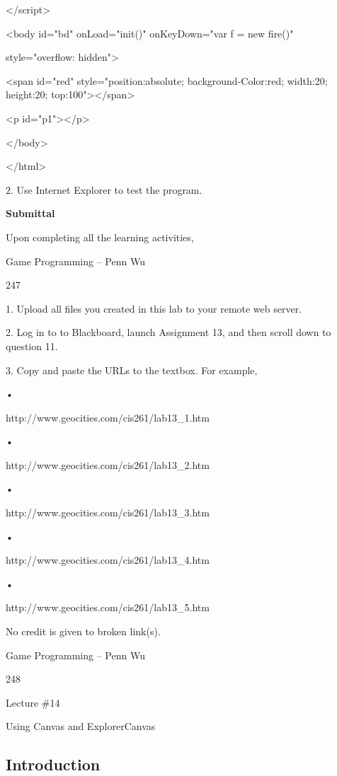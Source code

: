 \documentclass[
]{article}
\begin{document}
\textless/script\textgreater{}

\textless body id="bd" onLoad="init()" onKeyDown="var f = new fire()"

style="overflow: hidden"\textgreater{}

\textless span id="red" style="position:absolute; background-Color:red;
width:20; height:20; top:100"\textgreater\textless/span\textgreater{}

\textless p id="p1"\textgreater\textless/p\textgreater{}

\textless/body\textgreater{}

\textless/html\textgreater{}

2. Use Internet Explorer to test the program.

\textbf{Submittal}

Upon completing all the learning activities,

Game Programming -- Penn Wu

247

\protect\hypertarget{index_split_012.htmlux5cux23p248}{}{}1. Upload all
files you created in this lab to your remote web server.

2. Log in to to Blackboard, launch Assignment 13, and then scroll down
to question 11.

3. Copy and paste the URLs to the textbox. For example,

•

http://www.geocities.com/cis261/lab13\_1.htm

•

http://www.geocities.com/cis261/lab13\_2.htm

•

http://www.geocities.com/cis261/lab13\_3.htm

•

http://www.geocities.com/cis261/lab13\_4.htm

•

http://www.geocities.com/cis261/lab13\_5.htm

No credit is given to broken link(s).

Game Programming -- Penn Wu

248

\protect\hypertarget{index_split_012.htmlux5cux23p249}{}{}

Lecture \#14

Using Canvas and ExplorerCanvas

\protect\hypertarget{index_split_013.html}{}{}

\hypertarget{index_split_013.htmlux5cux23calibre_pb_12}{%
\subsection{Introduction}\label{index_split_013.htmlux5cux23calibre_pb_12}}
\end{document}
